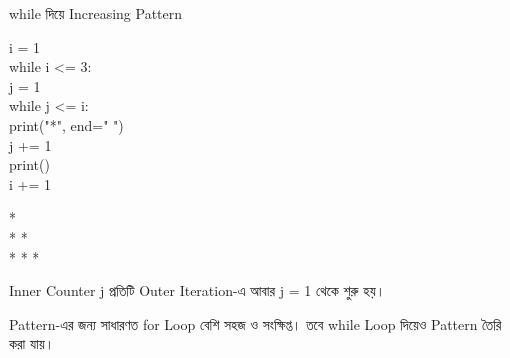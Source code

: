 \begin{codeoutputbox}{\textenglish{\ttfamily while} দিয়ে Increasing Pattern}

\noindent
\begin{minipage}[t]{0.57\linewidth}
\codeheading

\begin{english}
\ttfamily
i = 1\\
while i <= 3:\\
\hspace*{4mm}j = 1\\
\hspace*{4mm}while j <= i:\\
\hspace*{8mm}print("*", end=" ")\\
\hspace*{8mm}j += 1\\
\hspace*{4mm}print()\\
\hspace*{4mm}i += 1
\end{english}

\end{minipage}
\hfill
\begin{minipage}[t]{0.39\linewidth}
\outputheading

\begin{english}
\ttfamily
*\\
* *\\
* * *
\end{english}

\medskip

Inner Counter
\textenglish{\ttfamily j}
প্রতিটি Outer Iteration-এ আবার
\textenglish{\ttfamily j = 1}
থেকে শুরু হয়।

\end{minipage}

\end{codeoutputbox}

\begin{rememberbox}

Pattern-এর জন্য সাধারণত
\textenglish{\ttfamily for}
Loop বেশি সহজ ও সংক্ষিপ্ত।
তবে
\textenglish{\ttfamily while}
Loop দিয়েও Pattern তৈরি করা যায়।

\end{rememberbox}



